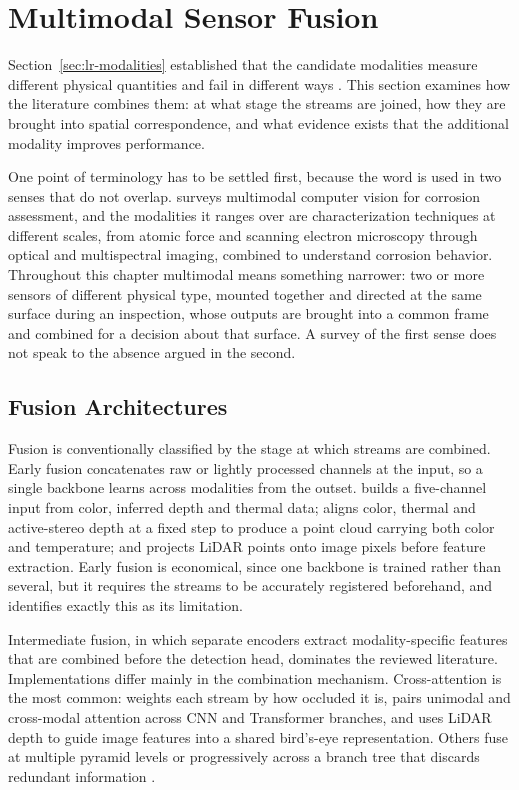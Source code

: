 \section{Multimodal Sensor Fusion}
\label{sec:lr-fusion}

Section~\ref{sec:lr-modalities} established that the candidate modalities
measure different physical quantities and fail in different ways \citep{Tran2024}. This section
examines how the literature combines them: at what stage the streams are joined,
how they are brought into spatial correspondence, and what evidence exists that
the additional modality improves performance.

One point of terminology has to be settled first, because the word is used in
two senses that do not overlap. \citet{Yao2026} surveys multimodal
computer vision for corrosion assessment, and the modalities it ranges over are
characterization techniques at different scales, from atomic force and scanning
electron microscopy through optical and multispectral imaging, combined to
understand corrosion behavior. Throughout this chapter multimodal means
something narrower: two or more sensors of different physical type, mounted
together and directed at the same surface during an inspection, whose outputs
are brought into a common frame and combined for a decision about that surface.
A survey of the first sense does not speak to the absence argued in the second.

\subsection{Fusion Architectures}

Fusion is conventionally classified by the stage at which streams are combined.
Early fusion concatenates raw or lightly processed channels at the input, so a
single backbone learns across modalities from the outset. \citet{Cao2026} builds
a five-channel input from color, inferred depth and thermal data;
\citet{Nooralishahi2022} aligns color, thermal and active-stereo depth at a fixed step to produce a
point cloud carrying both color and temperature; and \citet{Maru2025} projects
LiDAR points onto image pixels before feature extraction. Early fusion is
economical, since one backbone is trained rather than several, but it requires
the streams to be accurately registered beforehand, and \citet{Cao2026}
identifies exactly this as its limitation.

Intermediate fusion, in which separate encoders extract modality-specific
features that are combined before the detection head, dominates the reviewed
literature. Implementations differ mainly in the combination mechanism.
Cross-attention is the most common: \citet{Wang2026b} weights each stream by how
occluded it is, \citet{Jiang2024} pairs unimodal and cross-modal attention across
CNN and Transformer branches, and \citet{Cheng2025} uses LiDAR depth to guide image
features into a shared bird's-eye representation. Others fuse at multiple
pyramid levels \citep{Tang2026} or progressively across a branch tree that
discards redundant information \citep{Liu2025a}.


